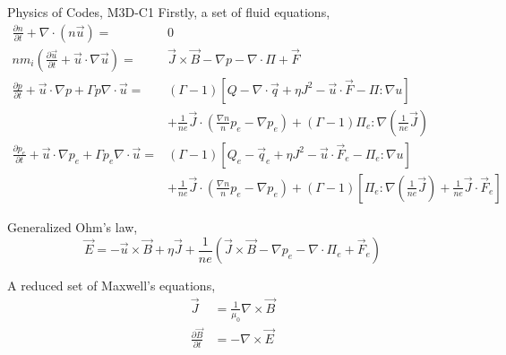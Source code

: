 \begin{frame}{Physics of Codes, M3D-C1}
Firstly, a set of fluid equations,
\begin{equation}
\begin{aligned} \frac{\partial n}{\partial t}+\nabla \cdot(n \vec{u})=& 0 \\ n m_{i}\left(\frac{\partial \vec{u}}{\partial t}+\vec{u} \cdot \nabla \vec{u}\right)=& \vec{J} \times \vec{B}-\nabla p-\nabla \cdot \Pi+\vec{F} \\ \frac{\partial p}{\partial t}+\vec{u} \cdot \nabla p+\Gamma p \nabla \cdot \vec{u}=&(\Gamma-1)\left[Q-\nabla \cdot \vec{q}+\eta J^{2}-\vec{u} \cdot \vec{F}-\Pi : \nabla u\right] \\ &+\frac{1}{n e} \vec{J} \cdot\left(\frac{\nabla n}{n} p_{e}-\nabla p_{e}\right)+(\Gamma-1) \Pi_{e} : \nabla\left(\frac{1}{n e} \vec{J}\right) \\ \frac{\partial p_{e}}{\partial t}+\vec{u} \cdot \nabla p_{e}+\Gamma p_{e} \nabla \cdot \vec{u}=&(\Gamma-1)\left[Q_{e}-\vec{q}_{e}+\eta J^{2}-\vec{u} \cdot \vec{F}_{e}-\Pi_{e} : \nabla u\right] \\ &+\frac{1}{n e} \vec{J} \cdot\left(\frac{\nabla n}{n} p_{e}-\nabla p_{e}\right)+(\Gamma-1)\left[\Pi_{e} : \nabla\left(\frac{1}{n e} \vec{J}\right)+\frac{1}{n e} \vec{J} \cdot \vec{F}_{e}\right] \end{aligned}
\end{equation}

Generalized Ohm's law,
\begin{equation}
\vec{E}=-\vec{u} \times \vec{B}+\eta \vec{J}+\frac{1}{n e}\left(\vec{J} \times \vec{B}-\nabla p_{e}-\nabla \cdot \Pi_{e}+\vec{F}_{e}\right)
\end{equation}

A reduced set of Maxwell's equations,
\begin{equation}
\begin{aligned} \vec{J} &=\frac{1}{\mu_{0}} \nabla \times \vec{B} \\ \frac{\partial \vec{B}}{\partial t} &=-\nabla \times \vec{E} \end{aligned}
\end{equation}
\end{frame}

